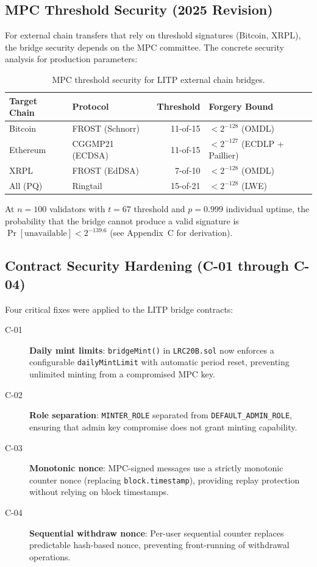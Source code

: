\documentclass[11pt,a4paper]{article}
\begin{document}
\subsection{MPC Threshold Security (2025 Revision)}

For external chain transfers that rely on threshold signatures (Bitcoin, XRPL), the bridge security depends on the MPC committee. The concrete security analysis for production parameters:

\begin{table}[H]
\centering
\caption{MPC threshold security for LITP external chain bridges.}
\label{tab:mpc_security}
\begin{tabular}{llrl}
\toprule
\textbf{Target Chain} & \textbf{Protocol} & \textbf{Threshold} & \textbf{Forgery Bound} \\
\midrule
Bitcoin & FROST (Schnorr) & 11-of-15 & $< 2^{-128}$ (OMDL) \\
Ethereum & CGGMP21 (ECDSA) & 11-of-15 & $< 2^{-127}$ (ECDLP + Paillier) \\
XRPL & FROST (EdDSA) & 7-of-10 & $< 2^{-128}$ (OMDL) \\
All (PQ) & Ringtail & 15-of-21 & $< 2^{-128}$ (LWE) \\
\bottomrule
\end{tabular}
\end{table}

At $n = 100$ validators with $t = 67$ threshold and $p = 0.999$ individual uptime, the probability that the bridge cannot produce a valid signature is $\Pr[\text{unavailable}] < 2^{-139.6}$ (see \cite{lux-bridge-2025} Appendix~C for derivation).

\subsection{Contract Security Hardening (C-01 through C-04)}

Four critical fixes were applied to the LITP bridge contracts:

\begin{description}
    \item[C-01] \textbf{Daily mint limits}: \texttt{bridgeMint()} in \texttt{LRC20B.sol} now enforces a configurable \texttt{dailyMintLimit} with automatic period reset, preventing unlimited minting from a compromised MPC key.
    \item[C-02] \textbf{Role separation}: \texttt{MINTER\_ROLE} separated from \texttt{DEFAULT\_ADMIN\_ROLE}, ensuring that admin key compromise does not grant minting capability.
    \item[C-03] \textbf{Monotonic nonce}: MPC-signed messages use a strictly monotonic counter nonce (replacing \texttt{block.timestamp}), providing replay protection without relying on block timestamps.
    \item[C-04] \textbf{Sequential withdraw nonce}: Per-user sequential counter replaces predictable hash-based nonce, preventing front-running of withdrawal operations.
\end{description}
\end{document}
